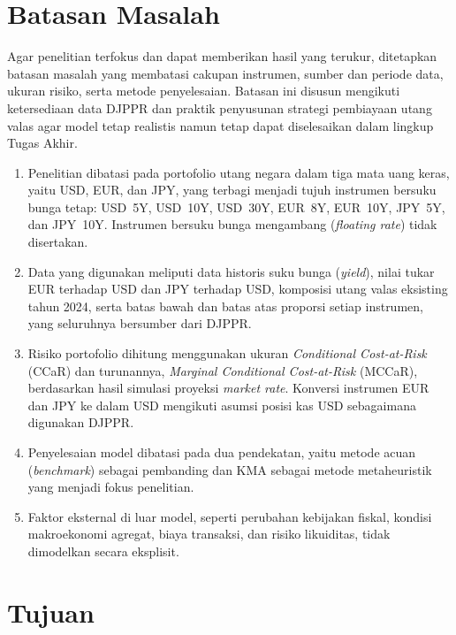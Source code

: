 
\section{Batasan Masalah}
\label{sec:batasan-masalah}
Agar penelitian terfokus dan dapat memberikan hasil yang terukur, ditetapkan batasan masalah yang membatasi cakupan instrumen, sumber dan periode data, ukuran risiko, serta metode penyelesaian. Batasan ini disusun mengikuti ketersediaan data DJPPR dan praktik penyusunan strategi pembiayaan utang valas agar model tetap realistis namun tetap dapat diselesaikan dalam lingkup Tugas Akhir.
\begin{enumerate}
  \item Penelitian dibatasi pada portofolio utang negara dalam tiga mata uang keras, yaitu USD, EUR, dan JPY, yang terbagi menjadi tujuh instrumen bersuku bunga tetap: USD~5Y, USD~10Y, USD~30Y, EUR~8Y, EUR~10Y, JPY~5Y, dan JPY~10Y. Instrumen bersuku bunga mengambang (\textit{floating rate}) tidak disertakan.
  \item Data yang digunakan meliputi data historis suku bunga (\textit{yield}), nilai tukar EUR terhadap USD dan JPY terhadap USD, komposisi utang valas eksisting tahun 2024, serta batas bawah dan batas atas proporsi setiap instrumen, yang seluruhnya bersumber dari DJPPR.
  \item Risiko portofolio dihitung menggunakan ukuran \textit{Conditional Cost-at-Risk} (CCaR) dan turunannya, \textit{Marginal Conditional Cost-at-Risk} (MCCaR), berdasarkan hasil simulasi proyeksi \textit{market rate}. Konversi instrumen EUR dan JPY ke dalam USD mengikuti asumsi posisi kas USD sebagaimana digunakan DJPPR.
  \item Penyelesaian model dibatasi pada dua pendekatan, yaitu metode acuan (\textit{benchmark}) sebagai pembanding dan KMA sebagai metode metaheuristik yang menjadi fokus penelitian.
  \item Faktor eksternal di luar model, seperti perubahan kebijakan fiskal, kondisi makroekonomi agregat, biaya transaksi, dan risiko likuiditas, tidak dimodelkan secara eksplisit.
\end{enumerate}


\section{Tujuan}
\label{sec:tujuan}


